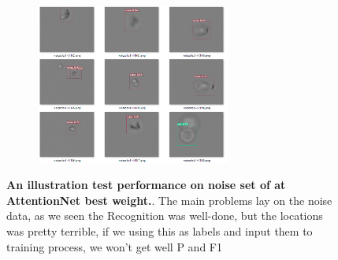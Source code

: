 \begin{figure}[t]
	\begin{center}
		\begin{subfigure}[t]{\textwidth}
		    \centering
			\includegraphics[width=0.7\textwidth]{thesis-template-master/images/An illustration test performance of CellYolo best weight2.png}
			\label{fig:cellnet}
		\end{subfigure}
	\end{center}
	\caption{\textbf{An illustration test performance on noise set of at AttentionNet best weight.}. The main problems lay on the noise data, as we seen the Recognition was well-done, but the locations was pretty terrible, if we using this as labels and input them to training process, we won’t get well P and F1}
\end{figure}


